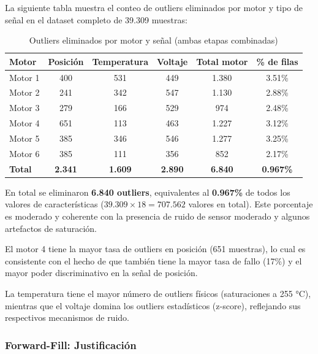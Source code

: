 \documentclass[12pt,a4paper]{article}
\begin{document}
La siguiente tabla muestra el conteo de outliers eliminados por motor y tipo de señal
en el dataset completo de 39.309 muestras:

\begin{table}[H]
\centering
\caption{Outliers eliminados por motor y señal (ambas etapas combinadas)}
\begin{tabular}{@{}lccccc@{}}
\toprule
\textbf{Motor} & \textbf{Posición} & \textbf{Temperatura} & \textbf{Voltaje}
               & \textbf{Total motor} & \textbf{\% de filas}\\
\midrule
Motor 1 & 400 & 531 & 449 & 1.380 & 3.51\%\\
Motor 2 & 241 & 342 & 547 & 1.130 & 2.88\%\\
Motor 3 & 279 & 166 & 529 &   974 & 2.48\%\\
Motor 4 & 651 & 113 & 463 & 1.227 & 3.12\%\\
Motor 5 & 385 & 346 & 546 & 1.277 & 3.25\%\\
Motor 6 & 385 & 111 & 356 &   852 & 2.17\%\\
\midrule
\textbf{Total} & \textbf{2.341} & \textbf{1.609} & \textbf{2.890}
               & \textbf{6.840} & \textbf{0.967\%}\\
\bottomrule
\end{tabular}
\end{table}

\begin{resultbox}
En total se eliminaron \textbf{6.840 outliers}, equivalentes al \textbf{0.967\%}
de todos los valores de características ($39.309 \times 18 = 707.562$ valores en total).
Este porcentaje es moderado y coherente con la presencia de ruido de sensor moderado
y algunos artefactos de saturación.

El motor 4 tiene la mayor tasa de outliers en posición (651 muestras), lo cual es
consistente con el hecho de que también tiene la mayor tasa de fallo (17\%) y el
mayor poder discriminativo en la señal de posición.

La temperatura tiene el mayor número de outliers físicos (saturaciones a 255 °C),
mientras que el voltaje domina los outliers estadísticos (z-score), reflejando sus
respectivos mecanismos de ruido.
\end{resultbox}

\subsubsection{Forward-Fill: Justificación}
\end{document}
